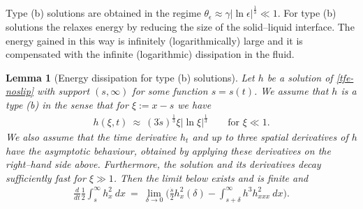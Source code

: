 \documentclass[pagesize,pdftex]{amsart}
\newtheorem{lemma}[theorem]{Lemma}
\renewcommand{\d}{\delta}
\newcommand{\gam}{\gamma}
\newcommand{\eps}{\epsilon}
\newcommand{\ang}{\theta}
\begin{document}
    Type (b) solutions are obtained in the regime
    $\ang_\eps \approx \gam |\ln \eps|^{\frac 13} \ll 1$. For type (b) solutions
    the relaxes energy by reducing the size of the solid--liquid interface. The
    energy gained in this way is infinitely (logarithmically) large and it is
    compensated with the infinite (logarithmic) dissipation in the fluid.
  \begin{lemma}[Energy dissipation for type (b) solutions]
    Let $h$ be a solution of \eqref{tfe-noslip} with support $(s,\infty)$ for
    some function $s = s(t)$. We assume that $h$ is a type (b) in the sense that
    for $\xi :=x- s$ we have
    \begin{align}
      h(\xi,t) \ %
      \approx \ (3 \dot s)^{\frac 13} \xi |\ln \xi|^{\frac 13} \qquad
      \text{for $\xi \ll 1$.}
    \end{align}
    We also assume that the time derivative $h_t$ and up to three spatial
    derivatives of $h$ have the asymptotic behaviour, obtained by applying these
    derivatives on the right--hand side above.  Furthermore, the solution and its
    derivatives decay sufficiently fast for $\xi\gg 1$. Then the limit below
    exists and is finite and
    \begin{align}
      \frac d{dt} \frac 12   \int_{s}^\infty h_x^2\ dx    \ %
      = \ \lim_{\d \to 0} \Big( \frac{\dot s}2h_x^2(\d )-\int_{s + \d}^{\infty}h^3h_{xxx}^2 \ dx \Big).
    \end{align}
\end{lemma}
\end{document}
